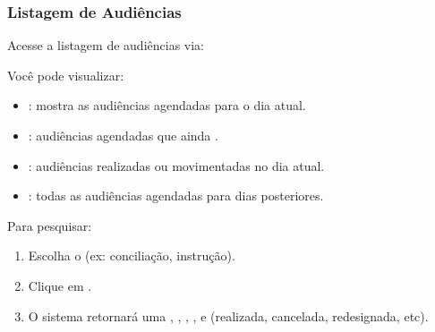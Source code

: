 \documentclass[letterpaper,10pt,brazil]{sphinxmanual}
\begin{document}
\subsubsection{Listagem de Audiências}
\label{\detokenize{projud_45_listasaudiencias:listagem-de-audiencias}}
\sphinxAtStartPar
Acesse a listagem de audiências via:

\sphinxAtStartPar
{}

\sphinxAtStartPar
Você pode visualizar:
\begin{itemize}
\item {} 
\sphinxAtStartPar
{}: mostra as audiências agendadas para o dia atual.

\item {} 
\sphinxAtStartPar
{}: audiências agendadas que ainda .

\item {} 
\sphinxAtStartPar
{}: audiências realizadas ou movimentadas no dia atual.

\item {} 
\sphinxAtStartPar
{}: todas as audiências agendadas para dias posteriores.

\end{itemize}

\sphinxAtStartPar
Para pesquisar:
\begin{enumerate}
%
\item {} 
\sphinxAtStartPar
Escolha o  (ex: conciliação, instrução).

\item {} 
\sphinxAtStartPar
Clique em .

\item {} 
\sphinxAtStartPar
O sistema retornará uma , , , ,  e  (realizada, cancelada, redesignada, etc).

\end{enumerate}
\end{document}
